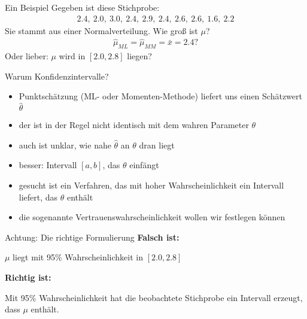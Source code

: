 \documentclass[t,11pt]{beamer}
\begin{document}
	\subtitle{}
	\logo{}
	\institute{}
	\date{}
	\subject{}

\addtocounter{framenumber}{-1}

\begin{frame}
\begin{exampleblock}{Ein Beispiel}
	Gegeben ist diese Stichprobe: 
	\begin{align*}
	2.4,~2.0,~3.0,~2.4,~2.9,~2.4,~2.6,~2.6,~1.6,~2.2
	\end{align*}
	Sie stammt aus einer Normalverteilung. Wie groß ist $\mu$?
	\begin{align*}
	\hat{\mu}_{ML} = \hat{\mu}_{MM} = \bar{x} = 2.4?
	\end{align*}
	Oder lieber: $\mu$ wird in $[2.0,2.8]$ liegen?
\end{exampleblock}
\end{frame}

\begin{frame}
	\begin{block}{Warum Konfidenzintervalle?}
		\begin{itemize}
			\item Punktschätzung (ML- oder Momenten-Methode) liefert uns einen Schätzwert $\hat{\theta}$
			\item der ist in der Regel nicht identisch mit dem wahren Parameter $\theta$
			\item auch ist unklar, wie nahe $\hat{\theta}$ an $\theta$ dran liegt
			\item besser: Intervall $[a,b]$, das $\theta$ einfängt
			\item gesucht ist ein Verfahren, das mit hoher Wahrscheinlichkeit ein Intervall liefert, das $\theta$ enthält
			\item die sogenannte Vertrauenswahrscheinlichkeit wollen wir festlegen können
		\end{itemize}
	\end{block}
\end{frame}

\begin{frame}
	\begin{alertblock}{Achtung: Die richtige Formulierung}
			\textbf{Falsch ist:} 
			
			$\mu$ liegt mit 95\% Wahrscheinlichkeit in $[2.0,2.8]$
			
			\vspace{0.2cm}
			\textbf{Richtig ist:} 
			
			Mit 95\% Wahrscheinlichkeit hat die beobachtete Stichprobe ein Intervall erzeugt, dass $\mu$ enthält.

	\end{alertblock}
\end{frame}
\end{document}
